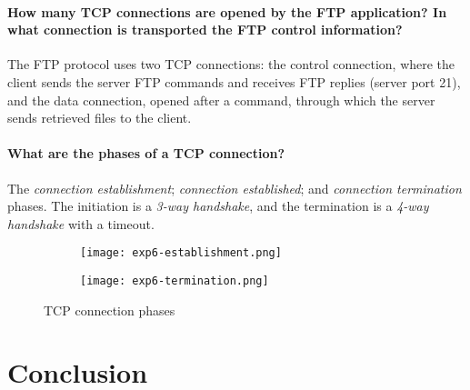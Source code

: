 \documentclass[compilation.tex]{subfiles}
\begin{document}
	\paragraph{How many TCP connections are opened by the FTP application? In what connection is transported the FTP control information?}
	The FTP protocol uses two TCP connections: the control connection, where the client sends the server FTP commands and receives FTP replies (server port 21), and the data connection, opened after a  command, through which the server sends retrieved files to the client.
	
	\paragraph{What are the phases of a TCP connection?}
	The \textsl{connection establishment}; \textsl{connection established}; and \textsl{connection termination} phases. The initiation is a \textit{3-way handshake}, and the termination is a \textit{4-way handshake} with a timeout.
	
	\begin{figure}[hbt]
		\centering
		\begin{subfigure}[b]{\textwidth}
			\centering
			\texttt{[image: exp6-establishment.png]}
			\vspace*{.8\baselineskip}
		\end{subfigure}
		\begin{subfigure}[b]{\textwidth}
			\centering
			\texttt{[image: exp6-termination.png]}
			\vspace*{.8\baselineskip}
		\end{subfigure}
		\caption{TCP connection phases}
		\label{fig:exp6-phases}
	\end{figure}
	
	
	\section{Conclusion}
	\label{sec:conclusion}
	
	
\end{document}
